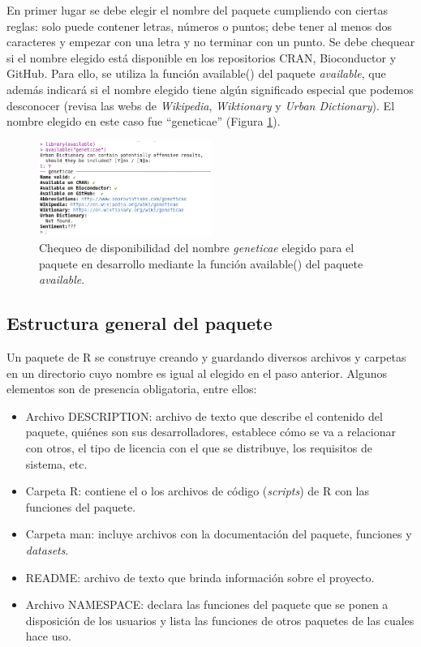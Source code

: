 En primer lugar se debe elegir el nombre del paquete cumpliendo con ciertas reglas: solo puede contener letras, números o puntos; debe tener al menos dos caracteres y empezar con una letra y no terminar con un punto. Se debe chequear si el nombre elegido está disponible en los repositorios  CRAN, Bioconductor y GitHub. Para ello, se utiliza la función \textcolor{fandango}{available()} del paquete \emph{available}, que además indicará si el nombre elegido tiene algún significado especial que podemos desconocer (revisa las webs de \emph{Wikipedia}, \emph{Wiktionary} y \emph{Urban Dictionary}). El nombre elegido en este caso fue ``geneticae''  (Figura \ref{fig:fig31}). 

\begin{figure}[h]
\begin{center}
	\includegraphics[width=0.50\textwidth]{./Graficos/available.png}	
\end{center}
	\caption{Chequeo de disponibilidad del nombre \emph{geneticae} elegido para el paquete en desarrollo mediante la función \textcolor{fandango}{available()} del paquete \emph{available}.}
\label{fig:fig31}
\end{figure}


\subsection{Estructura general del paquete}

Un paquete de R se construye creando y guardando diversos archivos y carpetas en un directorio cuyo nombre es igual al elegido en el paso anterior. Algunos elementos son de presencia obligatoria, entre ellos:

\begin{itemize}
\item Archivo DESCRIPTION: archivo de texto que describe el contenido del paquete, quiénes son sus desarrolladores, establece cómo se va a relacionar con otros, el tipo de licencia con el que se distribuye, los requisitos de sistema, etc.
\item Carpeta R: contiene el o los archivos de código (\emph{scripts}) de R con las funciones del paquete.
\item Carpeta man: incluye archivos con la documentación del paquete, funciones y \emph{datasets}.
\item README: archivo de texto que brinda información sobre el proyecto.
\item Archivo NAMESPACE: declara las funciones del paquete que se ponen a disposición de los usuarios y lista las funciones de otros paquetes de las cuales hace uso. 
\end{itemize}

